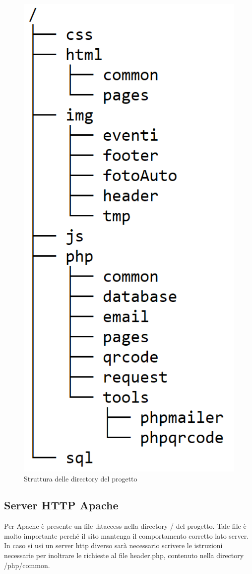\begin{figure}[H]
	\begin{center}
		\includegraphics[scale=1.2]{Images/albero.png}
		\caption{Struttura delle directory del progetto}
	\end{center}
\end{figure}

\subsection{Server HTTP Apache}
Per Apache è presente un file .htaccess nella directory / del progetto.
Tale file è molto importante perché il sito mantenga il comportamento corretto lato server.
In caso si usi un server http diverso sarà necessario scrivere le istruzioni necessarie per inoltrare le richieste al file header.php, contenuto nella directory /php/common.